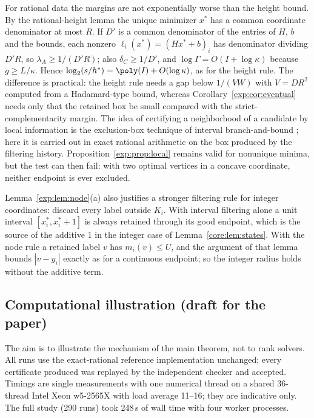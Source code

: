 \begin{remark}\label{exp:rem:height}
For rational data the margins are not exponentially worse than the height
bound. By the rational-height lemma the unique minimizer $x^*$ has a common
coordinate denominator at most $R$. If $D'$ is a common denominator of the
entries of $H$, $b$ and the bounds, each nonzero $\ell_i(x^*)=(Hx^*+b)_i$ has
denominator dividing $D'R$, so $\lambda_A\ge1/(D'R)$; also
$\delta_C\ge1/D'$, and $\log\Gamma=O(I+\log\kappa)$ because $g\ge L/\kappa$. Hence $\log_2(s/h^*)=\poly(I)+O(\log\kappa)$, as for the
height rule. The difference is practical: the height rule needs a gap below
$1/(VW)$ with $V=DR^2$ computed from a Hadamard-type bound, whereas
Corollary~\ref{exp:cor:eventual} needs only that the retained box be small
compared with the strict-complementarity margin. The idea of certifying a
neighborhood of a candidate by local information is the exclusion-box
technique of interval branch-and-bound \cite{Neumaier2004}; here it is
carried out in exact rational arithmetic on the box produced by the
filtering history. Proposition~\ref{exp:prop:local} remains valid for
nonunique minima, but the test can then fail: with two optimal vertices in a
concave coordinate, neither endpoint is ever excluded.
\end{remark}

\begin{remark}\label{exp:rem:integerfilter}
Lemma~\ref{exp:lem:node}(a) also justifies a stronger filtering rule for
integer coordinates: discard every label outside $K_i$. With interval
filtering alone a unit interval $[x^*_i,x^*_i+1]$ is always retained through
its good endpoint, which is the source of the additive $1$ in the integer
case of Lemma~\ref{core:lem:states}. With the node rule a retained label $v$
has $m_i(v)\le U$, and the argument of that lemma bounds $|v-y_i|$ exactly as
for a continuous endpoint; so the integer radius holds without the additive
term.
\end{remark}

\subsection{Computational illustration (draft for the paper)}\label{exp:sec:computation}

The aim is to illustrate the mechanism of the main theorem, not to rank
solvers. All runs use the exact-rational reference implementation
unchanged; every certificate produced was replayed by the independent
checker and accepted. Timings are single measurements with one numerical
thread on a shared 36-thread Intel Xeon w5-2565X with load average 11--16;
they are indicative only. The full study (290 runs) took 248\,s of wall time
with four worker processes.

